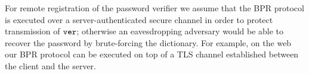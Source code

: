 For remote registration of the password verifier we assume that the \ac{BPR} protocol is executed over a server-authenticated secure channel in order to protect transmission of $\mathtt{ver}$; otherwise an eavesdropping adversary would be able to recover the password by brute-forcing the dictionary. 
For example, on the web our \ac{BPR} protocol can be executed on top of a TLS channel established between the client and the server.
% 	
